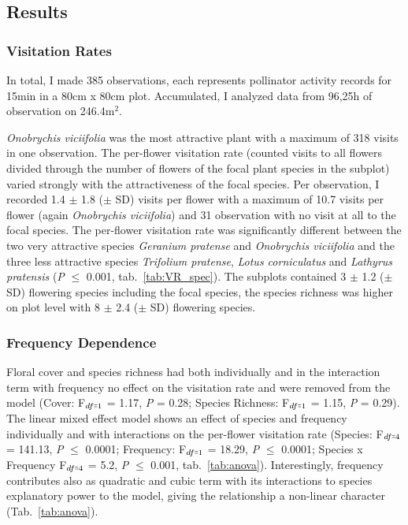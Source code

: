 \label{ch:results_jena}

\subsection{Results}

\subsubsection*{Visitation Rates}			

In total, I made 385 observations, each represents pollinator activity records for 15min in a 80cm x 80cm plot. Accumulated, I analyzed data from 96,25h of observation on 246.4m$^{2}$.

\textit{Onobrychis viciifolia} was the most attractive plant with a maximum of 318 visits in one observation. The per-flower visitation rate (counted visits to all flowers divided through the number of flowers of the focal plant species in the subplot) varied strongly with the attractiveness of the focal species. Per observation, I recorded 1.4 $\pm$ 1.8 ($\pm$ SD) visits per flower with a maximum of 10.7 visits per flower (again \textit{Onobrychis viciifolia}) and 31 observation with no visit at all to the focal species. The per-flower visitation rate was significantly different between the two very attractive species \textit{Geranium pratense} and \textit{Onobrychis viciifolia} and the three less attractive species  \textit{Trifolium pratense}, \textit{Lotus corniculatus} and \textit{Lathyrus pratensis} (\textit{P} $\leq$ 0.001, tab.~\ref{tab:VR_spec}). The subplots contained 3 $\pm$ 1.2 ($\pm$ SD) flowering species including the focal species, the species richness was higher on plot level with 8 $\pm$ 2.4 ($\pm$ SD) flowering species.

\subsubsection*{Frequency Dependence}			
Floral cover and species richness had both individually and in the interaction term with frequency no effect on the visitation rate and were removed from the model (Cover: F$_{df\shorteq1}$ = 1.17, \textit{P} = 0.28; Species Richness: F$ _{df\shorteq1} $ = 1.15, \textit{P} = 0.29). \\

The linear mixed effect model shows an effect of species and frequency individually and with interactions on the per-flower visitation rate (Species: F$_{df\shorteq4}$ = 141.13, \textit{P} $\leq$ 0.0001; Frequency: F$_{df\shorteq1}$ = 18.29, \textit{P} $\leq$ 0.0001; Species x Frequency F$_{ df\shorteq4}$ = 5.2, \textit{P} $\leq$ 0.001, tab.~\ref{tab:anova}). Interestingly, frequency contributes also as quadratic and cubic term with its interactions to species explanatory power to the model, giving the relationship a non-linear character (Tab.~\ref{tab:anova}).

